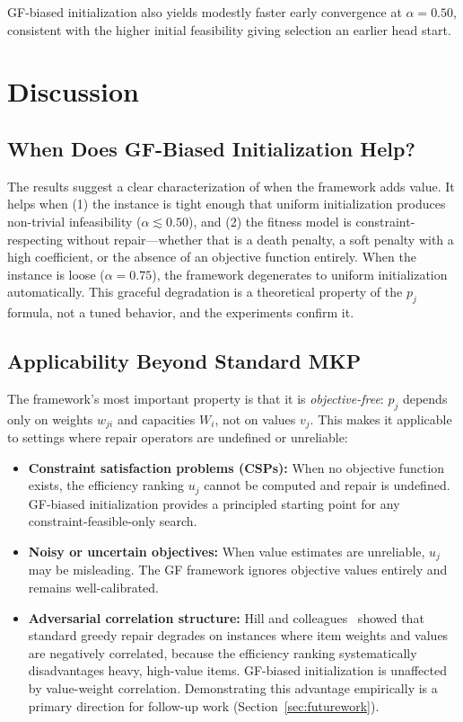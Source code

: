 \documentclass[twocolumn]{article}
\begin{document}
GF-biased initialization also yields modestly faster early convergence 
at $\alpha = 0.50$, consistent with the higher initial feasibility 
giving selection an earlier head start.

\section{Discussion}
\label{sec:discussion}

\subsection{When Does GF-Biased Initialization Help?}

The results suggest a clear characterization of when the framework adds 
value. It helps when (1) the instance is tight enough that uniform 
initialization produces non-trivial infeasibility ($\alpha \lesssim 0.50$), 
and (2) the fitness model is constraint-respecting without repair---whether 
that is a death penalty, a soft penalty with a high coefficient, or the 
absence of an objective function entirely. When the instance is loose 
($\alpha = 0.75$), the framework degenerates to uniform initialization 
automatically. This graceful degradation is a theoretical property of 
the $p_j$ formula, not a tuned behavior, and the experiments confirm it.

\subsection{Applicability Beyond Standard MKP}

The framework's most important property is that it is 
\textit{objective-free}: $p_j$ depends only on weights $w_{ji}$ and 
capacities $W_i$, not on values $v_j$. This makes it applicable to 
settings where repair operators are undefined or unreliable:

\begin{itemize}
    \item \textbf{Constraint satisfaction problems (CSPs):} When no 
    objective function exists, the efficiency ranking $u_j$ cannot be 
    computed and repair is undefined. GF-biased initialization provides 
    a principled starting point for any constraint-feasible-only search.
    \item \textbf{Noisy or uncertain objectives:} When value estimates 
    are unreliable, $u_j$ may be misleading. The GF framework ignores 
    objective values entirely and remains well-calibrated.
    \item \textbf{Adversarial correlation structure:} Hill and 
    colleagues~\cite{hill2012test} showed that standard greedy repair 
    degrades on instances where item weights and values are negatively 
    correlated, because the efficiency ranking systematically 
    disadvantages heavy, high-value items. GF-biased initialization is 
    unaffected by value-weight correlation. Demonstrating this advantage 
    empirically is a primary direction for follow-up work 
    (Section~\ref{sec:futurework}).
\end{itemize}
\end{document}
